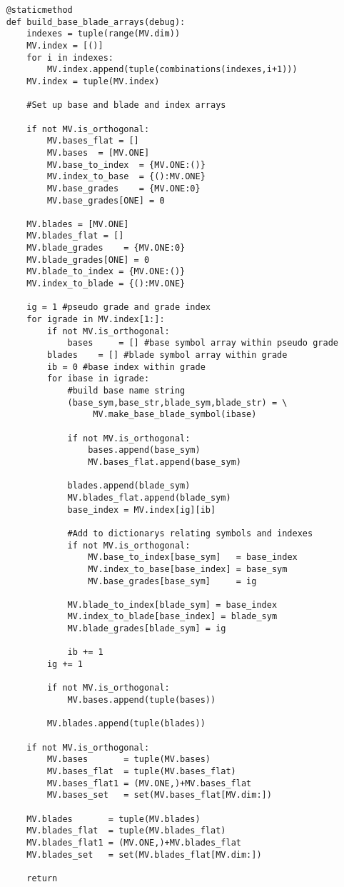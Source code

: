 \documentclass[10pt]{article}
\begin{document}
\begin{lstlisting}
    @staticmethod
    def build_base_blade_arrays(debug):
        indexes = tuple(range(MV.dim))
        MV.index = [()]
        for i in indexes:
            MV.index.append(tuple(combinations(indexes,i+1)))
        MV.index = tuple(MV.index)

        #Set up base and blade and index arrays

        if not MV.is_orthogonal:
            MV.bases_flat = []
            MV.bases  = [MV.ONE]
            MV.base_to_index  = {MV.ONE:()}
            MV.index_to_base  = {():MV.ONE}
            MV.base_grades    = {MV.ONE:0}
            MV.base_grades[ONE] = 0

        MV.blades = [MV.ONE]
        MV.blades_flat = []
        MV.blade_grades    = {MV.ONE:0}
        MV.blade_grades[ONE] = 0
        MV.blade_to_index = {MV.ONE:()}
        MV.index_to_blade = {():MV.ONE}

        ig = 1 #pseudo grade and grade index
        for igrade in MV.index[1:]:
            if not MV.is_orthogonal:
                bases     = [] #base symbol array within pseudo grade
            blades    = [] #blade symbol array within grade
            ib = 0 #base index within grade
            for ibase in igrade:
                #build base name string
                (base_sym,base_str,blade_sym,blade_str) = \
                     MV.make_base_blade_symbol(ibase)

                if not MV.is_orthogonal:
                    bases.append(base_sym)
                    MV.bases_flat.append(base_sym)

                blades.append(blade_sym)
                MV.blades_flat.append(blade_sym)
                base_index = MV.index[ig][ib]

                #Add to dictionarys relating symbols and indexes
                if not MV.is_orthogonal:
                    MV.base_to_index[base_sym]   = base_index
                    MV.index_to_base[base_index] = base_sym
                    MV.base_grades[base_sym]     = ig

                MV.blade_to_index[blade_sym] = base_index
                MV.index_to_blade[base_index] = blade_sym
                MV.blade_grades[blade_sym] = ig

                ib += 1
            ig += 1

            if not MV.is_orthogonal:
                MV.bases.append(tuple(bases))

            MV.blades.append(tuple(blades))

        if not MV.is_orthogonal:
            MV.bases       = tuple(MV.bases)
            MV.bases_flat  = tuple(MV.bases_flat)
            MV.bases_flat1 = (MV.ONE,)+MV.bases_flat
            MV.bases_set   = set(MV.bases_flat[MV.dim:])

        MV.blades       = tuple(MV.blades)
        MV.blades_flat  = tuple(MV.blades_flat)
        MV.blades_flat1 = (MV.ONE,)+MV.blades_flat
        MV.blades_set   = set(MV.blades_flat[MV.dim:])

        return
\end{lstlisting}
\end{document}
